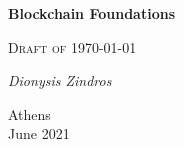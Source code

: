 \makeatletter
\def\@primarycover[#1][#2]{
 \begin{titlepage}
  \centering
  {\huge\bfseries Blockchain Foundations\par}
  \vspace{2cm}
  {\Large \color{red} \textsc{Draft of \today}\par}
  \vspace{2cm}
  {\Large\itshape Dionysis
                  Zindros\par}
  \vfill
  {\large Athens\\
          \vspace{1cm}
          #1\\
          #2\par
          }
 \end{titlepage}
}
\@primarycover[June 2021][]
\makeatother
\thispagestyle{empty}\newpage
